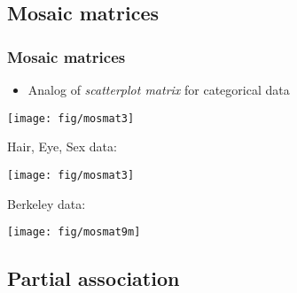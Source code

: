 \subsection{Mosaic matrices}
\begin{frame}
  \frametitle{Mosaic matrices}
  \begin{itemize}
	\item Analog of \emph{scatterplot matrix} for categorical data \citep{Friendly:99b}
  \end{itemize}
\begin{center}
  \texttt{[image: fig/mosmat3]}
\end{center}
\end{frame}

\begin{frame}
  Hair, Eye, Sex data:
\begin{center}
  \texttt{[image: fig/mosmat3]}
\end{center}
\end{frame}

\begin{frame}
Berkeley data: %
\begin{center}
  \texttt{[image: fig/mosmat9m]}
\end{center}
\end{frame}

\subsection{Partial association}

%

\endinput

 \begin{minipage}[b]{.5\linewidth}
  \centering
  \texttt{[image: fig/cmhdemo1]}
 \end{minipage}%
 \begin{minipage}[b]{.5\linewidth}
  \centering
  \texttt{[image: fig/cmhdemo2]}
 \end{minipage}

